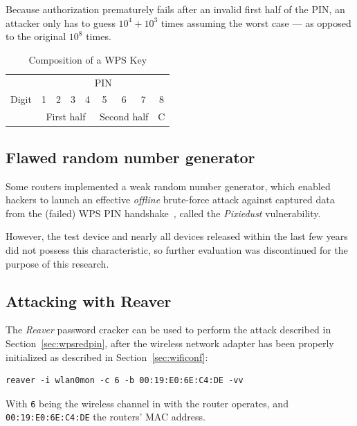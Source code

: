 Because authorization prematurely fails after an invalid first half of the PIN, an attacker only has to guess \(10^4 + 10^3\) times assuming the worst case --- as opposed to the original \(10^8\) times.

\begin{table}[]
\centering
\caption{Composition of a WPS Key}\label{tbl:wpskey}
\begin{tabular}{l|c|c|c|c|c|c|c|l|}
\cline{2-9}
 & \multicolumn{8}{c|}{PIN} \\ \cline{2-9} 
Digit & 1 & 2 & 3 & 4 & 5 & 6 & 7 & \multicolumn{1}{c|}{8} \\ \cline{2-9} 
 & \multicolumn{4}{c|}{First half} & \multicolumn{3}{c|}{Second half} & C \\ \cline{2-9} 
\end{tabular}
\end{table}

\subsection{Flawed random number generator}

Some routers implemented a weak random number generator, which enabled hackers to launch an effective \emph{offline} brute-force attack against captured data from the (failed) WPS PIN handshake~\cite{Bongard14}, called the \emph{Pixiedust} vulnerability.

However, the test device and nearly all devices released within the last few years did not possess this characteristic, so further evaluation was discontinued for the purpose of this research.

\subsection{Attacking with Reaver}\label{sec:reaver}

The \emph{Reaver} password cracker can be used to perform the attack described in Section~\ref{sec:wpsredpin}, after the wireless network adapter has been properly initialized as described in Section~\ref{sec:wificonf}:

\begin{lstlisting}
reaver -i wlan0mon -c 6 -b 00:19:E0:6E:C4:DE -vv
\end{lstlisting}

With \lstinline{6} being the wireless channel in with the router operates, and \lstinline{00:19:E0:6E:C4:DE} the routers' MAC address. 


